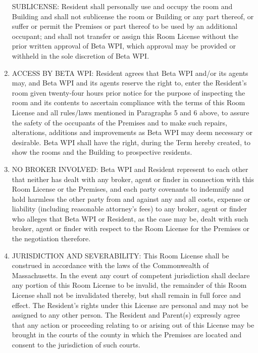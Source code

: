 \documentclass[legalpaper, 12pt]{article}
\begin{document}
\begin{enumerate}
SUBLICENSE\@: Resident shall personally use and occupy the room and Building and shall not sublicense the room or Building or any part thereof, or suffer or permit the Premises or part thereof to be used by an additional occupant; and shall not transfer or assign this Room License without the prior written approval of Beta WPI, which approval may be provided or withheld in the sole discretion of Beta WPI\@.

\item\label{itm:access}

ACCESS BY BETA WPI\@: Resident agrees that Beta WPI and/or its agents may, and Beta WPI and its agents reserve the right to, enter the Resident’s room given twenty-four hours prior notice for the purpose of inspecting the room and its contents to ascertain compliance with the terms of this Room License and all rules/laws mentioned in Paragraphs 5 and 6 above, to assure the safety of the occupants of the Premises and to make such repairs, alterations, additions and improvements as Beta WPI may deem necessary or desirable.
Beta WPI shall have the right, during the Term hereby created, to show the rooms and the Building to prospective residents.

\item\label{itm:broker}

NO BROKER INVOLVED\@: Beta WPI and Resident represent to each other that neither has dealt with any broker, agent or finder in connection with this Room License or the Premises, and each party covenants to indemnify and hold harmless the other party from and against any and all costs, expense or liability (including reasonable attorney’s fees) to any broker, agent or finder who alleges that Beta WPI or Resident, as the case may be, dealt with such broker, agent or finder with respect to the Room License for the Premises or the negotiation therefore.

\item\label{itm:jurisdiction}

JURISDICTION AND SEVERABILITY\@: This Room License shall be construed in accordance with the laws of the Commonwealth of Massachusetts.
In the event any court of competent jurisdiction shall declare any portion of this Room License to be invalid, the remainder of this Room License shall not be invalidated thereby, but shall remain in full force and effect.
The Resident’s rights under this License are personal and may not be assigned to any other person.
The Resident and Parent(s) expressly agree that any action or proceeding relating to or arising out of this License may be brought in the courts of the county in which the Premises are located and consent to the jurisdiction of such courts.


\end{enumerate}
\end{document}
